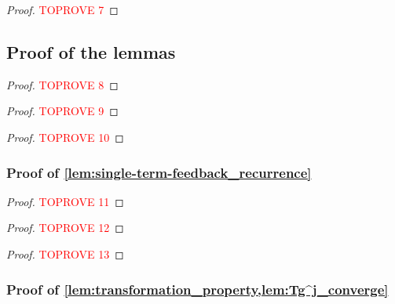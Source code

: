 \documentclass[a4paper,UKenglish,cleveref,autoref,thm-restate]{lipics-v2021}
\begin{document}
\begin{proof}\textcolor{red}{TOPROVE 7}\end{proof}























\subsection{Proof of the lemmas} \label{sec:proof_of_lemmas}

\begin{proof}\textcolor{red}{TOPROVE 8}\end{proof}


\begin{proof}\textcolor{red}{TOPROVE 9}\end{proof}









\begin{proof}\textcolor{red}{TOPROVE 10}\end{proof}

\subsubsection*{Proof of \cref{lem:single-term-feedback_recurrence}}






\begin{proof}\textcolor{red}{TOPROVE 11}\end{proof}

\begin{proof}\textcolor{red}{TOPROVE 12}\end{proof}

\begin{proof}\textcolor{red}{TOPROVE 13}\end{proof}

\subsubsection*{Proof of \cref{lem:transformation_property,lem:Tg^j_converge}} 
\end{document}
